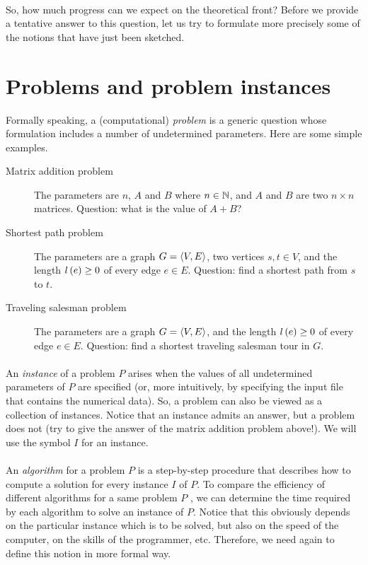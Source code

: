 \documentclass[titlepage]{book}
\makeatletter
\newcommand{\concept}[1]{\toindex{#1}\indexlayout{#1}}
\newcommand{\indexlayout}[1]{\emph{#1}}
\newcommand\toindex{\@ifstar{\@dblarg{\@toindexs}}{\@toindex}}
\def\@toindexs[#1]#2{\index{#1@#2}}
\newcommand\@toindex[2][]{%
  \if\relax\detokenize{#1}\relax
    \begingroup
    \@splitword#2\@nil%
    \uppercase\expandafter{%
      \expandafter\def\expandafter\@initial\expandafter{\@first}}%
    \toks0=\expandafter{\@initial}%
    \toks2=\expandafter{\@rest}%
    \edef\x{\endgroup\noexpand\index{\the\toks0 \the\toks2 }}\x
  \else
    \index{#1}
  \fi
}
\def\@splitword#1#2\@nil{\def\@first{#1}\def\@rest{#2}}
\theoremstyle{plain}
\theoremstyle{definition}
\theoremstyle{remark}
\makeatother
\begin{document}
\paragraph{}
So, how much progress can we expect on the theoretical front? Before we provide a tentative answer to this question, let us try to formulate more precisely some of the notions that have just been sketched.

\section{Problems and problem instances}
Formally speaking, a (computational) \concept{problem} is a generic question whose formulation includes a number of undetermined parameters. Here are some simple examples.

\begin{description}
 \item[Matrix addition problem] The parameters are $n$, $A$ and $B$ where $n\in\mathbb{N}$, and $A$ and $B$ are two $n\times n$ matrices. Question: what is the value of $A+B$?
 \item[Shortest path problem] The parameters are a graph $G=\left\langle V,E \right\rangle$, two vertices $s,t\in V$, and the length $l\left( e \right)\geq 0$ of every edge $e\in E$. Question: find a shortest path from $s$ to $t$.
 \item[Traveling salesman problem] The parameters are a graph $G=\left\langle V,E \right\rangle$, and the length $l\left( e \right)\geq 0$ of every edge $e\in E$. Question: find a shortest traveling salesman tour in $G$.
\end{description}

\paragraph{}
An \concept{instance} of a problem $P$ arises when the values of all undetermined parameters of $P$ are specified (or, more intuitively, by specifying the input file that contains the numerical data). So, a problem can also be viewed as a collection of instances. Notice that an instance admits an answer, but a problem does not (try to give the answer of the matrix addition problem above!). We will use the symbol $I$ for an instance.

\paragraph{}
An \concept{algorithm} for a problem $P$ is a step-by-step procedure that describes how to compute a solution for every instance $I$ of $P$. To compare the efficiency of different algorithms for a same problem $P$ , we can determine the time required by each algorithm to solve an instance of $P$. Notice that this obviously depends on the particular instance which is to be solved, but also on the speed of the computer, on the skills of the programmer, etc. Therefore, we need again to define this notion in more formal way.
\end{document}
